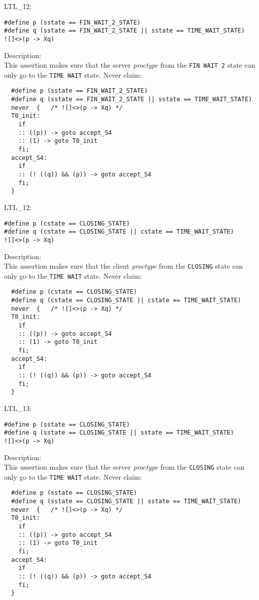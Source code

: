\documentclass{WigReport}
\begin{document}
LTL\_12:\\
\begin{lstlisting}
#define p (sstate == FIN_WAIT_2_STATE)
#define q (sstate == FIN_WAIT_2_STATE || sstate == TIME_WAIT_STATE)
![]<>(p -> Xq)
\end{lstlisting}
Description:\\
This assertion makes sure that the server \textit{proctype} from the \verb|FIN WAIT 2| state can only go to the \verb|TIME WAIT| state.
Never claim:\\
\begin{lstlisting}
  #define p (sstate == FIN_WAIT_2_STATE)
  #define q (sstate == FIN_WAIT_2_STATE || sstate == TIME_WAIT_STATE)
  never  {   /* ![]<>(p -> Xq) */
  T0_init:
    if
    :: ((p)) -> goto accept_S4
    :: (1) -> goto T0_init
    fi;
  accept_S4:
    if
    :: (! ((q)) && (p)) -> goto accept_S4
    fi;
  }
\end{lstlisting}


LTL\_12:\\
\begin{lstlisting}
#define p (cstate == CLOSING_STATE)
#define q (cstate == CLOSING_STATE || cstate == TIME_WAIT_STATE)
![]<>(p -> Xq)
\end{lstlisting}
Description:\\
This assertion makes sure that the client \textit{proctype} from the
\verb|CLOSING| state can only go to the \verb|TIME WAIT| state.
Never claim:\\
\begin{lstlisting}
  #define p (cstate == CLOSING_STATE)
  #define q (cstate == CLOSING_STATE || cstate == TIME_WAIT_STATE)
  never  {   /* ![]<>(p -> Xq) */
  T0_init:
    if
    :: ((p)) -> goto accept_S4
    :: (1) -> goto T0_init
    fi;
  accept_S4:
    if
    :: (! ((q)) && (p)) -> goto accept_S4
    fi;
  }
\end{lstlisting}


LTL\_13:\\
\begin{lstlisting}
#define p (sstate == CLOSING_STATE)
#define q (sstate == CLOSING_STATE || sstate == TIME_WAIT_STATE)
![]<>(p -> Xq)
\end{lstlisting}
Description:\\
This assertion makes sure that the server \textit{proctype} from the
\verb|CLOSING| state can only go to the \verb|TIME WAIT| state.
Never claim:\\
\begin{lstlisting}
  #define p (sstate == CLOSING_STATE)
  #define q (sstate == CLOSING_STATE || sstate == TIME_WAIT_STATE)
  never  {   /* ![]<>(p -> Xq) */
  T0_init:
    if
    :: ((p)) -> goto accept_S4
    :: (1) -> goto T0_init
    fi;
  accept_S4:
    if
    :: (! ((q)) && (p)) -> goto accept_S4
    fi;
  }
\end{lstlisting}
\end{document}

